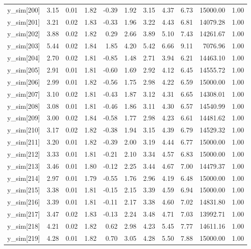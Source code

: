 \begin{table}[ht]
\begin{tabular}{rrrrrrrrrrr}
  y\_sim[200] & 3.15 & 0.01 & 1.82 & -0.39 & 1.92 & 3.15 & 4.37 & 6.73 & 15000.00 & 1.00 \\ 
  y\_sim[201] & 3.21 & 0.02 & 1.83 & -0.33 & 1.96 & 3.22 & 4.43 & 6.81 & 14079.28 & 1.00 \\ 
  y\_sim[202] & 3.88 & 0.02 & 1.82 & 0.29 & 2.66 & 3.89 & 5.10 & 7.43 & 14261.67 & 1.00 \\ 
  y\_sim[203] & 5.44 & 0.02 & 1.84 & 1.85 & 4.20 & 5.42 & 6.66 & 9.11 & 7076.96 & 1.00 \\ 
  y\_sim[204] & 2.70 & 0.02 & 1.81 & -0.85 & 1.48 & 2.71 & 3.94 & 6.21 & 14463.10 & 1.00 \\ 
  y\_sim[205] & 2.91 & 0.01 & 1.81 & -0.60 & 1.69 & 2.92 & 4.12 & 6.45 & 14555.72 & 1.00 \\ 
  y\_sim[206] & 2.99 & 0.01 & 1.82 & -0.56 & 1.75 & 2.98 & 4.22 & 6.59 & 15000.00 & 1.00 \\ 
  y\_sim[207] & 3.10 & 0.02 & 1.81 & -0.43 & 1.87 & 3.12 & 4.31 & 6.65 & 14308.01 & 1.00 \\ 
  y\_sim[208] & 3.08 & 0.01 & 1.81 & -0.46 & 1.86 & 3.11 & 4.30 & 6.57 & 14540.99 & 1.00 \\ 
  y\_sim[209] & 3.00 & 0.02 & 1.84 & -0.58 & 1.77 & 2.98 & 4.23 & 6.61 & 14481.62 & 1.00 \\ 
  y\_sim[210] & 3.17 & 0.02 & 1.82 & -0.38 & 1.94 & 3.15 & 4.39 & 6.79 & 14529.32 & 1.00 \\ 
  y\_sim[211] & 3.20 & 0.01 & 1.82 & -0.39 & 2.00 & 3.19 & 4.44 & 6.77 & 15000.00 & 1.00 \\ 
  y\_sim[212] & 3.33 & 0.01 & 1.81 & -0.21 & 2.10 & 3.34 & 4.57 & 6.83 & 15000.00 & 1.00 \\ 
  y\_sim[213] & 3.46 & 0.01 & 1.80 & -0.12 & 2.25 & 3.44 & 4.67 & 7.00 & 14479.37 & 1.00 \\ 
  y\_sim[214] & 2.97 & 0.01 & 1.79 & -0.55 & 1.76 & 2.96 & 4.19 & 6.48 & 15000.00 & 1.00 \\ 
  y\_sim[215] & 3.38 & 0.01 & 1.81 & -0.15 & 2.15 & 3.39 & 4.59 & 6.94 & 15000.00 & 1.00 \\ 
  y\_sim[216] & 3.39 & 0.01 & 1.81 & -0.11 & 2.17 & 3.38 & 4.60 & 7.02 & 14831.80 & 1.00 \\ 
  y\_sim[217] & 3.47 & 0.02 & 1.83 & -0.13 & 2.24 & 3.48 & 4.71 & 7.03 & 13992.71 & 1.00 \\ 
  y\_sim[218] & 4.21 & 0.02 & 1.82 & 0.62 & 2.98 & 4.23 & 5.45 & 7.77 & 14611.16 & 1.00 \\ 
  y\_sim[219] & 4.28 & 0.01 & 1.82 & 0.70 & 3.05 & 4.28 & 5.50 & 7.88 & 15000.00 & 1.00 \\ 

\end{tabular}
\end{table}
